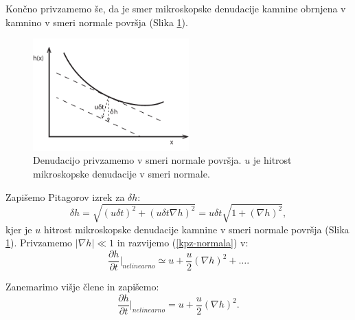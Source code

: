 \documentclass[a4paper, twoside, 12pt]{book}
\begin{document}

Končno privzamemo še, da je smer mikroskopske denudacije kamnine obrnjena v kamnino v smeri normale površja (Slika \ref{fig:KPZ}). 
\begin{figure}[h!]
  \begin{center}
    \includegraphics[width=6cm]{slike/denudacija}
  \end{center}
  \caption{Denudacijo privzamemo v smeri normale površja. $u$ je hitrost mikroskopske denudacije v smeri normale.}
  \label{fig:KPZ}
\end{figure}

Zapišemo Pitagorov izrek za $\delta h$:
\begin{equation}
  \delta h = \sqrt{(u \delta t)^2 + (u \delta t \nabla h)^2} = u \delta t \sqrt{1 + (\nabla h)^2},
  \label{kpz-normala}
\end{equation}
kjer je $u$ hitrost mikroskopske denudacije kamnine v smeri normale površja (Slika \ref{fig:KPZ}). Privzamemo $|\nabla h| \ll 1$ in razvijemo (\ref{kpz-normala}) v:
\begin{equation}
  \frac{\partial h}{\partial t} \bigg|_{nelinearno} \simeq u + \frac{u}{2} (\nabla h)^2 + \dots .
\end{equation}

Zanemarimo višje člene in zapišemo:
\begin{equation}
  \frac{\partial h}{\partial t} \bigg|_{nelinearno} = u + \frac{u}{2} (\nabla h)^2.
\end{equation}
\end{document}

